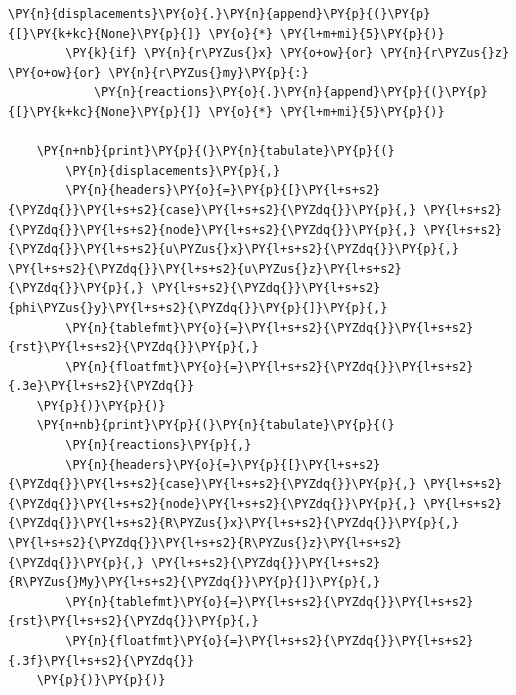 \begin{tcolorbox}[breakable, size=fbox, boxrule=1pt, pad at break*=1mm,colback=cellbackground, colframe=cellborder]
\begin{Verbatim}[commandchars=\\\{\}]
        \PY{n}{displacements}\PY{o}{.}\PY{n}{append}\PY{p}{(}\PY{p}{[}\PY{k+kc}{None}\PY{p}{]} \PY{o}{*} \PY{l+m+mi}{5}\PY{p}{)}
        \PY{k}{if} \PY{n}{r\PYZus{}x} \PY{o+ow}{or} \PY{n}{r\PYZus{}z} \PY{o+ow}{or} \PY{n}{r\PYZus{}my}\PY{p}{:}
            \PY{n}{reactions}\PY{o}{.}\PY{n}{append}\PY{p}{(}\PY{p}{[}\PY{k+kc}{None}\PY{p}{]} \PY{o}{*} \PY{l+m+mi}{5}\PY{p}{)}
    
    \PY{n+nb}{print}\PY{p}{(}\PY{n}{tabulate}\PY{p}{(}
        \PY{n}{displacements}\PY{p}{,}
        \PY{n}{headers}\PY{o}{=}\PY{p}{[}\PY{l+s+s2}{\PYZdq{}}\PY{l+s+s2}{case}\PY{l+s+s2}{\PYZdq{}}\PY{p}{,} \PY{l+s+s2}{\PYZdq{}}\PY{l+s+s2}{node}\PY{l+s+s2}{\PYZdq{}}\PY{p}{,} \PY{l+s+s2}{\PYZdq{}}\PY{l+s+s2}{u\PYZus{}x}\PY{l+s+s2}{\PYZdq{}}\PY{p}{,} \PY{l+s+s2}{\PYZdq{}}\PY{l+s+s2}{u\PYZus{}z}\PY{l+s+s2}{\PYZdq{}}\PY{p}{,} \PY{l+s+s2}{\PYZdq{}}\PY{l+s+s2}{phi\PYZus{}y}\PY{l+s+s2}{\PYZdq{}}\PY{p}{]}\PY{p}{,}
        \PY{n}{tablefmt}\PY{o}{=}\PY{l+s+s2}{\PYZdq{}}\PY{l+s+s2}{rst}\PY{l+s+s2}{\PYZdq{}}\PY{p}{,}
        \PY{n}{floatfmt}\PY{o}{=}\PY{l+s+s2}{\PYZdq{}}\PY{l+s+s2}{.3e}\PY{l+s+s2}{\PYZdq{}}
    \PY{p}{)}\PY{p}{)}
    \PY{n+nb}{print}\PY{p}{(}\PY{n}{tabulate}\PY{p}{(}
        \PY{n}{reactions}\PY{p}{,}
        \PY{n}{headers}\PY{o}{=}\PY{p}{[}\PY{l+s+s2}{\PYZdq{}}\PY{l+s+s2}{case}\PY{l+s+s2}{\PYZdq{}}\PY{p}{,} \PY{l+s+s2}{\PYZdq{}}\PY{l+s+s2}{node}\PY{l+s+s2}{\PYZdq{}}\PY{p}{,} \PY{l+s+s2}{\PYZdq{}}\PY{l+s+s2}{R\PYZus{}x}\PY{l+s+s2}{\PYZdq{}}\PY{p}{,} \PY{l+s+s2}{\PYZdq{}}\PY{l+s+s2}{R\PYZus{}z}\PY{l+s+s2}{\PYZdq{}}\PY{p}{,} \PY{l+s+s2}{\PYZdq{}}\PY{l+s+s2}{R\PYZus{}My}\PY{l+s+s2}{\PYZdq{}}\PY{p}{]}\PY{p}{,}
        \PY{n}{tablefmt}\PY{o}{=}\PY{l+s+s2}{\PYZdq{}}\PY{l+s+s2}{rst}\PY{l+s+s2}{\PYZdq{}}\PY{p}{,}
        \PY{n}{floatfmt}\PY{o}{=}\PY{l+s+s2}{\PYZdq{}}\PY{l+s+s2}{.3f}\PY{l+s+s2}{\PYZdq{}}
    \PY{p}{)}\PY{p}{)}
    \end{Verbatim}
    \end{tcolorbox}
    
